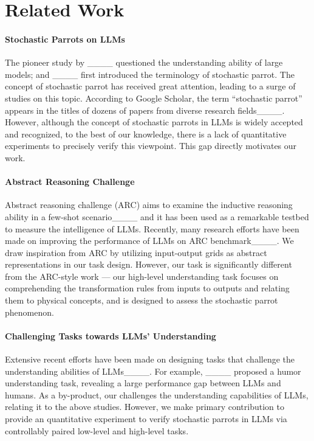 \section{Related Work}
\paragraph{Stochastic Parrots on LLMs}
The pioneer study by ____ questioned the understanding ability of large models; and ____ first introduced the terminology of stochastic parrot.
The concept of stochastic parrot has received great attention, leading to a surge of studies on this topic. 
According to Google Scholar, the term ``stochastic parrot'' appears in the titles of dozens of papers from diverse research fields____. 
However, although the concept of stochastic parrots in LLMs is widely accepted and recognized, to the best of our knowledge, there is a lack of quantitative experiments to precisely verify this viewpoint. This gap directly motivates our work.




\paragraph{Abstract Reasoning Challenge}

Abstract reasoning challenge (ARC) aims to examine the inductive reasoning ability in a few-shot scenario____ and it has been used as a remarkable testbed to measure the intelligence of LLMs.
Recently, many research efforts have been made on improving the performance of LLMs on ARC benchmark____. 
We draw inspiration from ARC by utilizing input-output grids as abstract representations in our task design. However, our task is significantly different from the ARC-style work --- our high-level understanding task focuses on comprehending the transformation rules from inputs to outputs and relating them to physical concepts, and is designed to assess the stochastic parrot phenomenon.


\paragraph{Challenging Tasks towards LLMs' Understanding}
Extensive recent efforts have been made on designing tasks that challenge the understanding abilities of LLMs____. 
For example, %
____ proposed a humor understanding task, revealing a large performance gap between LLMs and humans.
As a by-product, our \datasetname challenges the understanding capabilities of LLMs, relating it to the above studies. 
However, we make primary contribution to provide an quantitative experiment to verify stochastic parrots in LLMs via controllably paired low-level and high-level tasks.